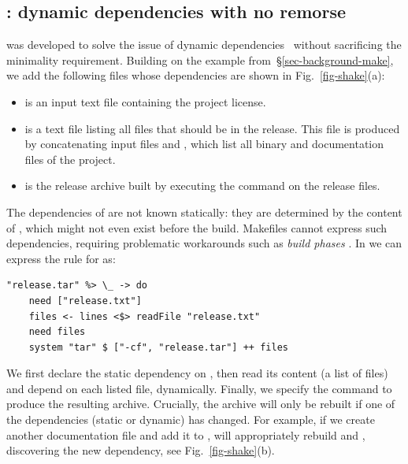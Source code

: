 \subsection{\Shake: dynamic dependencies with no remorse}
\label{sec-background-shake}

\Shake was developed to solve the issue of dynamic
dependencies~\cite{mitchell2012shake} without sacrificing
the minimality requirement. Building on the \Make example
from~\S\ref{sec-background-make}, we add the following files whose
dependencies are shown in Fig.~\ref{fig-shake}(a):

\begin{itemize}
    \item {} is an input text file containing the project license.
    \item {} is a text file listing all files that should be in the release. This file
    is produced by concatenating input files  and ,
    which list all binary and documentation files of the project.
    \item {} is the release archive built by executing the
    command  on the release files.
\end{itemize}

The dependencies of  are not known statically: they are
determined by the content of , which might not even exist
before the build. Makefiles cannot express such dependencies, requiring problematic
workarounds such as \emph{build phases} \cite{hadrian}.
In \Shake we can express the rule for  as:

\begin{verbatim}
"release.tar" %> \_ -> do
    need ["release.txt"]
    files <- lines <$> readFile "release.txt"
    need files
    system "tar" $ ["-cf", "release.tar"] ++ files
\end{verbatim}

\noindent
We first declare the static dependency on , then read its
content (a list of files) and depend on each listed file, dynamically. Finally, we specify the
command to produce the resulting archive. Crucially, the archive will only be
rebuilt if one of the dependencies (static or dynamic) has changed. For example,
if we create another documentation file  and add it to
, \Shake will appropriately rebuild  and
, discovering the new dependency, see Fig.~\ref{fig-shake}(b).

